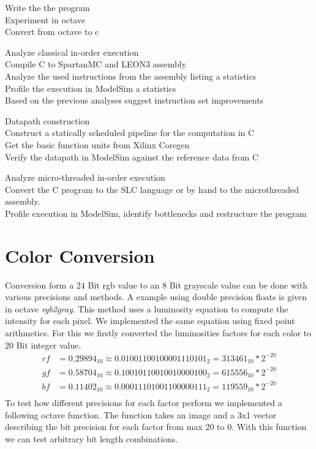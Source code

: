 \documentclass[a4paper,fontsize=12pt]{scrartcl}
\begin{document}
	\begin{description}
		\item Write the the program \\
		Experiment in octave \\
		Convert from octave to c \\
		
		\item Analyze classical in-order execution \\
		Compile C to SpartanMC and LEON3 assembly \\
		Analyze the used instructions from the assembly listing a statistics \\
		Profile the execution in ModelSim a statistics \\
		Based on the previous analyses suggest instruction set improvements \\
		
		\item Datapath construction \\
		Construct a statically scheduled pipeline for the computation in C \\
		Get the basic function units from Xilinx Coregen \\
		Verify the datapath in ModelSim against the reference data from C\\
		
		\item Analyze micro-threaded in-order execution \\
		Convert the C program to the SLC language or by hand to the microthreaded assembly. \\
		Profile execution in ModelSim, identify bottlenecks and restructure the program \\
	\end{description}
	
	\section{Color Conversion}
	Conversion form a 24 Bit rgb value to an 8 Bit grayscale value can be done with various precisions and methods. A example using double precision floats is given in octave \textit{rgb2gray}. This method uses a luminosity equation to compute the intensity for each pixel. We implemented the same equation using fixed point arithmetics. For this we firstly converted the luminosities factors for each color to 20 Bit integer value.
	\begin{align*}
		rf &= 0.29894_{10} \approx  0.01001100100001110101_{2} = 313461_{10} * 2^{-20} \\
		gf &= 0.58704_{10} \approx  0.10010110010010000100_{2} = 615556_{10} * 2^{-20} \\
		bf &= 0.11402_{10} \approx  0.00011101001100000111_{2} = 119559_{10} * 2^{-20} \\
	\end{align*}
	To test how different precisions for each factor perform we implemented a following octave function. The function takes an image and a 3x1 vector describing the bit precision for each factor from max 20 to 0. With this function we can test arbitrary bit length combinations.
\end{document}
